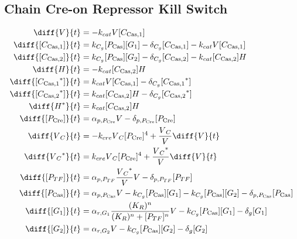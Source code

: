 \subsection{Chain Cre-on Repressor Kill Switch}
\label{s:Chain_Cre_on_Repressor_Kill_Switch}

\begin{align}
\diff{\vectorGen{}}{t} & = - \casCutRate{{}}\vectorGen{}\conc{\cplx{\cas}{1}}\\
\diff{\conc{\cplx{\cas}{1}}}{t} & =  \gRnaBind{}\conc{\proSp{\cas{}}}\conc{\gRna{1}} - \casCompDegradeRate{}\conc{\cplx{\cas}{1}} - \casCutRate{{}}\vectorGen{}\conc{\cplx{\cas}{1}}\\
\diff{\conc{\cplx{\cas}{2}}}{t} & =  \gRnaBind{}\conc{\proSp{\cas{}}}\conc{\gRna{2}} - \casCompDegradeRate{}\conc{\cplx{\cas}{2}} - \casCutRate{{}}\conc{\cplx{\cas}{2}}\hostGen{}\\
\diff{\hostGen{}}{t} & = - \casCutRate{{}}\conc{\cplx{\cas}{2}}\hostGen{}\\
\diff{\conc{\bound{\cplx{\cas}{1}}}}{t} & =  \casCutRate{{}}\vectorGen{}\conc{\cplx{\cas}{1}} - \casCompDegradeRate{}\conc{\bound{\cplx{\cas}{1}}}\\
\diff{\conc{\bound{\cplx{\cas}{2}}}}{t} & =  \casCutRate{{}}\conc{\cplx{\cas}{2}}\hostGen{} - \casCompDegradeRate{}\conc{\bound{\cplx{\cas}{2}}}\\
\diff{\edited{\hostGen{}}}{t} & =  \casCutRate{{}}\conc{\cplx{\cas}{2}}\hostGen{}\\
\diff{\conc{\proSp{\cre{}}}}{t} & =  \txtlRate{\proSp{\cre{}}}\vectorGen{} - \proDegradeRate{\proSp{\cre{}}}\conc{\proSp{\cre{}}}\\
\diff{\vectorGen{}_C}{t} & = - \creCutRate{} \vectorGen{}_C \conc{\proSp{\cre{}}}^4 + \frac{\vectorGen{}_C}{\vectorGen{}} \diff{\vectorGen{}}{t}\\
\diff{\edited{\vectorGen{}_C}}{t} & =  \creCutRate{} \vectorGen{}_C \conc{\proSp{\cre{}}}^4 + \frac{\edited{\vectorGen{}_C}}{\vectorGen{}} \diff{\vectorGen{}}{t}\\
\diff{\conc{\proSp{TF}}}{t} & =  \txtlRate{\proSp{TF}}\frac{\edited{\vectorGen{}_C}}{\vectorGen{}}\vectorGen{} - \proDegradeRate{\proSp{TF}}\conc{\proSp{TF}}\\
\diff{\conc{\proSp{\cas{}}}}{t} & =  \txtlRate{\proSp{\cas{}}}\vectorGen{} - \gRnaBind{}\conc{\proSp{\cas{}}}\conc{\gRna{1}} - \gRnaBind{}\conc{\proSp{\cas{}}}\conc{\gRna{2}} - \proDegradeRate{\proSp{\cas{}}}\conc{\proSp{\cas{}}}\\
\diff{\conc{\gRna{1}}}{t} & =  \txRate{\gRna{1}}\frac{(K_R)^n}{(K_R)^n + \conc{\proSp{TF}}^n}\vectorGen{} - \gRnaBind{}\conc{\proSp{\cas{}}}\conc{\gRna{1}} - \rnaDegradeRate{}\conc{\gRna{1}}\\
\diff{\conc{\gRna{2}}}{t} & =  \txRate{\gRna{2}}\vectorGen{} - \gRnaBind{}\conc{\proSp{\cas{}}}\conc{\gRna{2}} - \rnaDegradeRate{}\conc{\gRna{2}}
\end{align}

